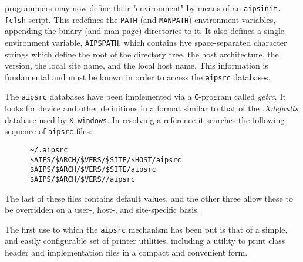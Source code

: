    \aipspp programmers may now define their \aipspp "environment" by means of
an {\tt aipsinit.[c]sh} script.  This redefines the {\tt PATH} (and
{\tt MANPATH}) environment variables, appending the \aipspp binary (and man
page) directories to it.  It also defines a single environment variable,
{\tt AIPSPATH}, which contains five space-separated character strings which
define the root of the \aipspp directory tree, the host architecture, the
\aipspp version, the local site name, and the local host name.  This
information is fundamental and must be known in order to access the
{\tt aipsrc} databases.

   The {\tt aipsrc} databases have been implemented via a {\tt C}-program
called {\it getrc}.  It looks for device and other definitions in a format
similar to that of the {\it .Xdefaults} database used by {\tt X-windows}.  In
resolving a reference it searches the following sequence of {\tt aipsrc}
files:

\begin{verbatim}
      ~/.aipsrc
      $AIPS/$ARCH/$VERS/$SITE/$HOST/aipsrc
      $AIPS/$ARCH/$VERS/$SITE/aipsrc
      $AIPS/$ARCH/$VERS//aipsrc
\end{verbatim}

The last of these files contains default values, and the other three allow
these to be overridden on a user-, host-, and site-specific basis.

   The first use to which the {\tt aipsrc} mechanism has been put is that of a
simple, and easily configurable set of printer utilities, including a utility
to print class header and implementation files in a compact and convenient
form. 



